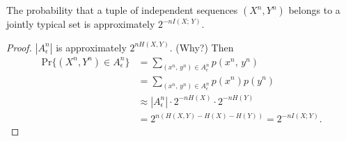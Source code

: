 \begin{lemma}
The probability that a tuple of independent sequences $(X^n,Y^n)$ belongs to a jointly typical set is approximately $2^{-nI(X;\,Y)}$.

\begin{proof}
    $|A_{\epsilon}^n|$ is approximately $2^{nH(X,Y)}$. (Why?)
    Then \[\begin{aligned}\text{Pr}\{(X^n,Y^n)\in A_\epsilon^n\}&=\sum _{(x^n,
    \,y^n)\in A_{\epsilon}^n}p(x^n,\,y^n)\\&=\sum _{(x^n,
    \,y^n)\in A_{\epsilon}^n}p(x^n)p(y^n)\\&\approx|A_{\epsilon}^n|\cdot2^{-nH(X)}\cdot2^{-nH(Y)}\\&=2^{n(H(X,Y)-H(X)-H(Y))}=2^{-nI(X;Y)}.\end{aligned}\]
\end{proof}
\end{lemma}

